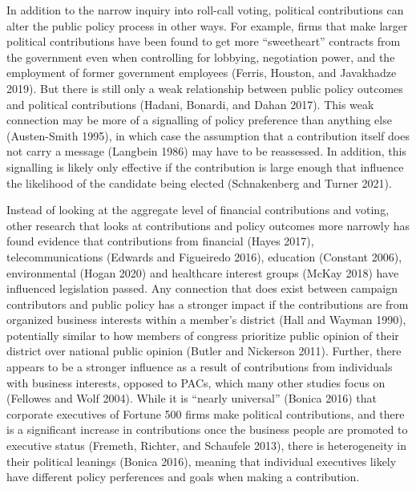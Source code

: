 \documentclass[12pt,]{article}
\begin{document}
In addition to the narrow inquiry into roll-call voting, political
contributions can alter the public policy process in other ways. For
example, firms that make larger political contributions have been found
to get more ``sweetheart'' contracts from the government even when
controlling for lobbying, negotiation power, and the employment of
former government employees (Ferris, Houston, and Javakhadze 2019). But
there is still only a weak relationship between public policy outcomes
and political contributions (Hadani, Bonardi, and Dahan 2017). This weak
connection may be more of a signalling of policy preference than
anything else (Austen-Smith 1995), in which case the assumption that a
contribution itself does not carry a message (Langbein 1986) may have to
be reassessed. In addition, this signalling is likely only effective if
the contribution is large enough that influence the likelihood of the
candidate being elected (Schnakenberg and Turner 2021).

Instead of looking at the aggregate level of financial contributions and
voting, other research that looks at contributions and policy outcomes
more narrowly has found evidence that contributions from financial
(Hayes 2017), telecommunications (Edwards and Figueiredo 2016),
education (Constant 2006), environmental (Hogan 2020) and healthcare
interest groups (McKay 2018) have influenced legislation passed. Any
connection that does exist between campaign contributors and public
policy has a stronger impact if the contributions are from organized
business interests within a member's district (Hall and Wayman 1990),
potentially similar to how members of congress prioritize public opinion
of their district over national public opinion (Butler and Nickerson
2011). Further, there appears to be a stronger influence as a result of
contributions from individuals with business interests, opposed to PACs,
which many other studies focus on (Fellowes and Wolf 2004). While it is
``nearly universal'' (Bonica 2016) that corporate executives of Fortune
500 firms make political contributions, and there is a significant
increase in contributions once the business people are promoted to
executive status (Fremeth, Richter, and Schaufele 2013), there is
heterogeneity in their political leanings (Bonica 2016), meaning that
individual executives likely have different policy perferences and goals
when making a contribution.
\end{document}
